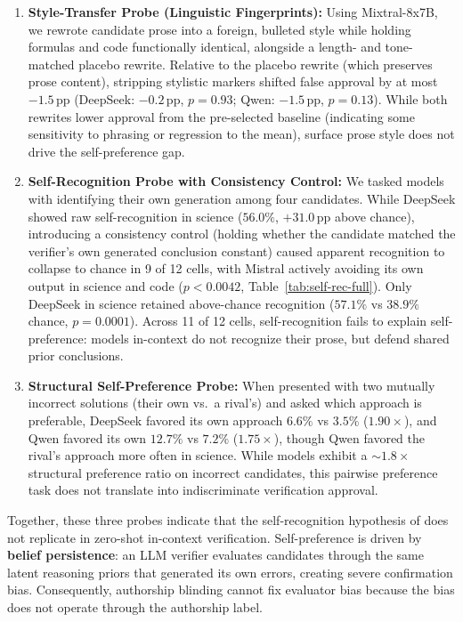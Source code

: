 \begin{enumerate}[nosep, leftmargin=*]
  \item \textbf{Style-Transfer Probe (Linguistic Fingerprints):} Using Mixtral-8x7B, we rewrote candidate prose into a foreign, bulleted style while holding formulas and code functionally identical, alongside a length- and tone-matched placebo rewrite. Relative to the placebo rewrite (which preserves prose content), stripping stylistic markers shifted false approval by at most $-1.5$\,pp (DeepSeek: $-0.2$\,pp, $p = 0.93$; Qwen: $-1.5$\,pp, $p = 0.13$). While both rewrites lower approval from the pre-selected baseline (indicating some sensitivity to phrasing or regression to the mean), surface prose style does not drive the self-preference gap.
  \item \textbf{Self-Recognition Probe with Consistency Control:} We tasked models with identifying their own generation among four candidates. While DeepSeek showed raw self-recognition in science ($56.0\%$, $+31.0$\,pp above chance), introducing a consistency control (holding whether the candidate matched the verifier's own generated conclusion constant) caused apparent recognition to collapse to chance in 9 of 12 cells, with Mistral actively avoiding its own output in science and code ($p < 0.0042$, Table~\ref{tab:self-rec-full}). Only DeepSeek in science retained above-chance recognition ($57.1\%$ vs $38.9\%$ chance, $p = 0.0001$). Across 11 of 12 cells, self-recognition fails to explain self-preference: models in-context do not recognize their prose, but defend shared prior conclusions.
  \item \textbf{Structural Self-Preference Probe:} When presented with two mutually incorrect solutions (their own vs.\ a rival's) and asked which approach is preferable, DeepSeek favored its own approach $6.6\%$ vs $3.5\%$ ($1.90\times$), and Qwen favored its own $12.7\%$ vs $7.2\%$ ($1.75\times$), though Qwen favored the rival's approach more often in science. While models exhibit a $\sim 1.8\times$ structural preference ratio on incorrect candidates, this pairwise preference task does not translate into indiscriminate verification approval.
\end{enumerate}

Together, these three probes indicate that the self-recognition hypothesis of \citet{panickssery2024llm} does not replicate in zero-shot in-context verification. Self-preference is driven by \textbf{belief persistence}: an LLM verifier evaluates candidates through the same latent reasoning priors that generated its own errors, creating severe confirmation bias. Consequently, authorship blinding cannot fix evaluator bias because the bias does not operate through the authorship label.

